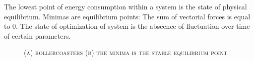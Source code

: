 \documentclass{article}
\begin{document}
  \pagebreak

  The lowest point of energy consumption within a system is the state of physical equilibrium.
  Minimas are equilibrium points: The sum of vectorial forces is equal to 0.
  The state of optimization of system is the abscence of fluctuation over time of certain parameters.

  \begin{figure}[H]
    \centering
    \caption{\textsc{(a) rollercoasters (b) the minima is the stable equilibrium point}}
  \end{figure}
\end{document}
